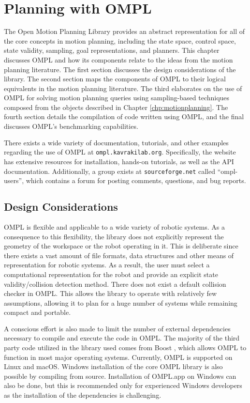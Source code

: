 \chapter {Planning with OMPL}
\label {chp:ompl}

The Open Motion Planning Library provides an abstract representation for all
of the core concepts in motion planning, including the state space, control space,
state validity, sampling, goal representations, and planners.  This chapter
discusses OMPL and how its components relate to the ideas from the motion
planning literature.  The first section discusses the design considerations of
the library.  The second section maps the components of OMPL to their logical
equivalents in the motion planning literature.  The third elaborates on the
use of OMPL for solving motion planning queries using sampling-based techniques
composed from the objects described in Chapter \ref{chp:motionplanning}.  The
fourth section details the compilation of code written using OMPL, and the final
discusses OMPL's benchmarking capabilities.

There exists a wide variety of documentation, tutorials, and other examples
regarding the use of OMPL at {\tt ompl.kavrakilab.org}.  Specifically, the
website has extensive resources for installation, hands-on tutorials, as well
as the API documentation.  Additionally, a group exists at {\tt sourceforge.net}
called ``ompl-users'', which contains a forum for posting comments, questions,
and bug reports.

\section {Design Considerations}
\label{chp:design}
OMPL is flexible and applicable to a wide variety of robotic systems.  As a
consequence to this flexibility, the library does not explicitly represent the
geometry of the workspace or the robot operating in it.  This is deliberate
since there exists a vast amount of file formats, data structures and other
means of representation for robotic systems.  As a result, the user must select
a computational representation for the robot and provide an explicit state
validity/collision detection method.  There does not exist a default collision
checker in OMPL.  This allows the library to operate with relatively few
assumptions, allowing it to plan for a huge number of systems while remaining
compact and portable.

A conscious effort is also made to limit the number of external dependencies
necessary to compile and execute the code in OMPL.  The majority of the third
party code utilized in the library used comes from Boost \cite{Boost}, which
allows OMPL to function in most major operating systems.  Currently, OMPL is
supported on Linux and macOS.  Windows installation of the core OMPL
library is also possible by compiling from source.  Installation of OMPL.app on
Windows can also be done, but this is recommended only for experienced Windows
developers as the installation of the dependencies is challenging.

